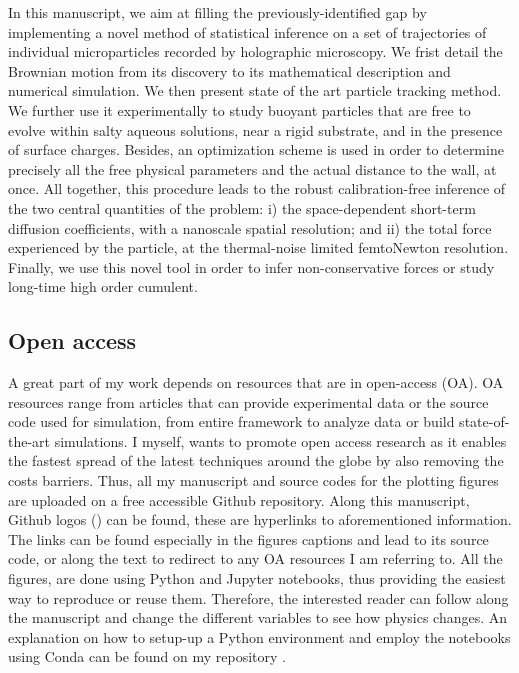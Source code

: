 In this manuscript, we aim at filling the previously-identified gap by implementing a novel method of statistical inference on a set of trajectories of individual microparticles recorded by holographic microscopy. We frist detail the Brownian motion from its discovery to its mathematical description and numerical simulation. We then present state of the art particle tracking method. We further use it experimentally to study  buoyant particles that are free to evolve within salty aqueous solutions, near a rigid substrate, and in the presence of surface charges. Besides, an optimization scheme is used in order to determine precisely all the free physical parameters and the actual distance to the wall, at once. All together, this procedure leads to the robust calibration-free inference of the two central quantities of the problem: i) the space-dependent short-term diffusion coefficients, with a nanoscale spatial resolution; and ii) the total force experienced by the particle, at the thermal-noise limited femtoNewton resolution. Finally, we use this novel tool in order to infer non-conservative forces or study long-time high order cumulent.



\subsection{Open access}

A great part of my work depends on resources that are in open-access (OA). OA resources range from articles that can provide experimental data or the source code used for simulation, from entire framework to analyze data or build state-of-the-art simulations. I myself, wants to promote open access research as it enables the fastest spread of the latest techniques around the globe by also removing the costs barriers. Thus, all my manuscript and source codes for the plotting figures are uploaded on a free accessible Github repository. Along this manuscript, Github logos (\href{https://github.com/eXpensia/Ma-these/}{\faGithub}) can be found, these are hyperlinks to aforementioned information. The links can be found especially in the figures captions and lead to its source code, or along the text to redirect to any OA resources I am referring to. All the figures, are done using Python and Jupyter notebooks, thus providing the easiest way to reproduce or reuse them. Therefore, the interested reader can follow along the manuscript and change the different variables to see how physics changes.  An explanation on how to setup-up a Python environment and employ the notebooks using Conda can be found on my repository \href{https://github.com/eXpensia/Ma-these/}{\faGithub}.


